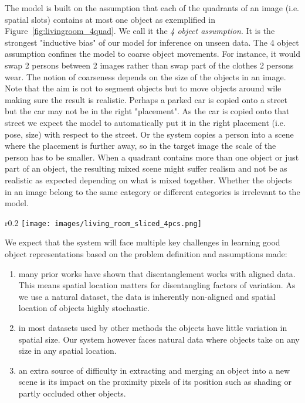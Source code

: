 \documentclass[a4paper,12pt]{report}
\begin{document}
The model is built on the assumption that each of the quadrants of an image (i.e. spatial slots) contains at most one object as exemplified in Figure~\ref{fig:livingroom_4quad}. We call it the \textit{4 object assumption}. It is the strongest "inductive bias" of our model for inference on unseen data. The 4 object assumption confines the model to coarse object movements. For instance, it would swap 2 persons between 2 images rather than swap part of the clothes 2 persons wear. The notion of coarseness depends on the size of the objects in an image. Note that the aim is not to segment objects but to move objects around wile making sure the result is realistic. Perhaps a parked car is copied onto a street but the car may not be in the right "placement". As the car is copied onto that street we expect the model to automatically put it in the right placement (i.e. pose, size) with respect to the street. Or the system copies a person into a scene where the placement is further away, so in the target image the scale of the person has to be smaller. When a quadrant contains more than one object or just part of an object, the resulting mixed scene might suffer realism and not be as realistic as expected depending on what is mixed together. Whether the objects in an image belong to the same category or different categories is irrelevant to the model.
\begin{wrapfigure}{r}{0.2\textwidth}
\texttt{[image: images/living\_room\_sliced\_4pcs.png]} 
\caption{The 4 object assumption: 0 or 1 object per quadrant.} %
\label{fig:livingroom_4quad}
\end{wrapfigure}

We expect that the system will face multiple key challenges in learning good object representations based on the problem definition and assumptions made:
\begin{enumerate}
  \item many prior works have shown that disentanglement works with aligned data. This means spatial location matters for disentangling factors of variation. As we use a natural dataset, the data is inherently non-aligned and spatial location of objects highly stochastic.
  \item  in most datasets used by other methods the objects have little variation in spatial size. Our system however faces natural data where objects take on any size in any spatial location.
  \item an extra source of difficulty in extracting and merging an object into a new scene is its impact on the proximity pixels of its position such as shading or partly occluded other objects.
\end{enumerate}
\end{document}
